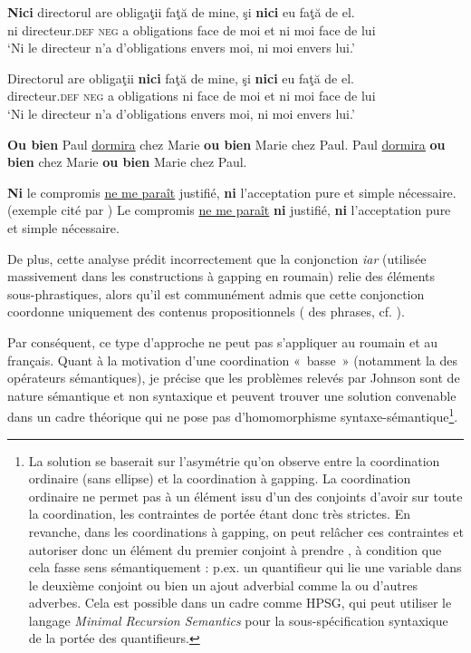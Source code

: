 \ea
\ea 
\gll \textbf{Nici}  directorul    are  obligaţii  faţă  de  mine,  şi  \textbf{nici}  eu  faţă  de  el. \label{ch2:ex228a}\\
ni  directeur.\textsc{def} \textsc{neg}  a  obligations  face  de  moi  et  ni  moi  face  de  lui\\
\glt ‘Ni le directeur n’a d’obligations envers moi, ni moi envers lui.’  

\ex  
\gll *Directorul    are  obligaţii  \textbf{nici}  faţă  de  mine,  şi  \textbf{nici}  eu  faţă  de  el. \label{ch2:ex228b}\\
directeur.\textsc{def} \textsc{neg}  a  obligations  ni  face  de  moi  et  ni  moi  face  de  lui\\
\glt ‘Ni le directeur n’a d’obligations envers moi, ni moi envers lui.’
\z
\z


\ea
\ea \textbf{Ou bien} Paul \uline{dormira} chez Marie \textbf{ou bien} Marie chez Paul. \label{ch2:ex229a} 
\ex *Paul \uline{dormira} \textbf{ou bien} chez Marie \textbf{ou bien} Marie chez Paul.   
\z \label{ch2:ex229b}
\z

\ea
\ea \textbf{Ni} le compromis \uline{ne me paraît} justifié, \textbf{ni} l’acceptation pure et simple nécessaire. (exemple cité par \citealt{GrevisseEtAl1991}) \label{ch2:ex230a}     
\ex *Le compromis \uline{ne me paraît} \textbf{ni} justifié, \textbf{ni} l’acceptation pure et simple nécessaire. \label{ch2:ex230b}                   
\z
\z

De plus, cette analyse prédit incorrectement que la conjonction \textit{iar} (utilisée massivement dans les constructions à gapping en roumain) relie des éléments sous-phrastiques, alors qu’il est communément admis que cette conjonction coordonne uniquement des contenus propositionnels ({\cad} des phrases, cf. \citealt{BilbiieEtAl2011}). 

Par conséquent, ce type d’approche ne peut pas s’appliquer au roumain et au français. Quant à la motivation d’une coordination «~basse~» (notamment la  des opérateurs sémantiques), je précise que les problèmes relevés par Johnson sont de nature sémantique et non syntaxique et peuvent trouver une solution convenable dans un cadre théorique qui ne pose pas d’homomorphisme syntaxe-sémantique\footnote{
 La solution se baserait sur l’asymétrie qu’on observe entre la coordination ordinaire (sans ellipse) et la coordination à gapping. La coordination ordinaire ne permet pas à un élément issu d’un des conjoints d’avoir  sur toute la coordination, les contraintes de portée étant donc très strictes. En revanche, dans les coordinations à gapping, on peut relâcher ces contraintes et autoriser donc un élément du premier conjoint à prendre , à condition que cela fasse sens sémantiquement : p.ex. un quantifieur qui lie une variable dans le deuxième conjoint ou bien un ajout adverbial comme la  ou d’autres adverbes. Cela est possible dans un cadre comme HPSG, qui peut utiliser le langage \textit{Minimal Recursion Semantics} pour la sous-spécification syntaxique de la portée des quantifieurs.}. 


